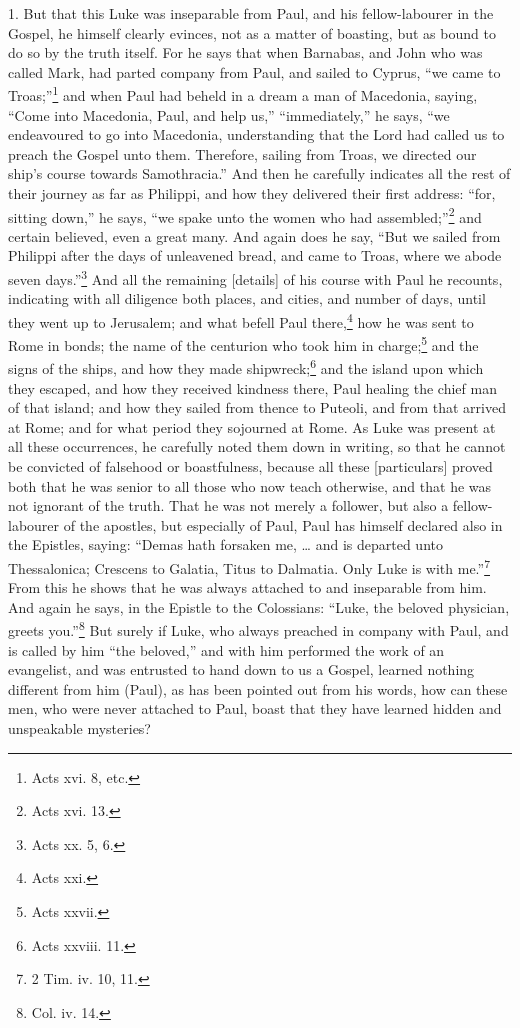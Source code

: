 1. But that this Luke was inseparable from Paul, and his fellow-labourer in the Gospel, he himself clearly evinces, not as a matter of boasting, but as bound to do so by the truth itself. For he says that when Barnabas, and John who was called Mark, had parted company from Paul, and sailed to Cyprus, “we came to Troas;”\footnote{Acts xvi. 8, etc.} and when Paul had beheld in a dream a man of Macedonia, saying, “Come into Macedonia, Paul, and help us,” “immediately,” he says, “we endeavoured to go into Macedonia, understanding that the Lord had called us to preach the Gospel unto them. Therefore, sailing from Troas, we directed our ship’s course towards Samothracia.” And then he carefully indicates all the rest of their journey as far as Philippi, and how they delivered their first address: “for, sitting down,” he says, “we spake unto the women who had assembled;”\footnote{Acts xvi. 13.} and certain believed, even a great many. And again does he say, “But we sailed from Philippi after the days of unleavened bread, and came to Troas, where we abode seven days.”\footnote{Acts xx. 5, 6.} And all the remaining [details] of his course with Paul he recounts, indicating with all diligence both places, and cities, and number of days, until they went up to Jerusalem; and what befell Paul there,\footnote{Acts xxi.} how he was sent to Rome in bonds; the name of the centurion who took him in charge;\footnote{Acts xxvii.} and the signs of the ships, and how they made shipwreck;\footnote{Acts xxviii. 11.} and the island upon which they escaped, and how they received kindness there, Paul healing the chief man of that island; and how they sailed from thence to Puteoli, and from that arrived at Rome; and for what period they sojourned at Rome. As Luke was present at all these occurrences, he carefully noted them down in writing, so that he cannot be convicted of falsehood or boastfulness, because all these [particulars] proved both that he was senior to all those who now teach otherwise, and that he was not ignorant of the truth. That he  was not merely a follower, but also a fellow-labourer of the apostles, but especially of Paul, Paul has himself declared also in the Epistles, saying: “Demas hath forsaken me, … and is departed unto Thessalonica; Crescens to Galatia, Titus to Dalmatia. Only Luke is with me.”\footnote{2 Tim. iv. 10, 11.} From this he shows that he was always attached to and inseparable from him. And again he says, in the Epistle to the Colossians: “Luke, the beloved physician, greets you.”\footnote{Col. iv. 14.} But surely if Luke, who always preached in company with Paul, and is called by him “the beloved,” and with him performed the work of an evangelist, and was entrusted to hand down to us a Gospel, learned nothing different from him (Paul), as has been pointed out from his words, how can these men, who were never attached to Paul, boast that they have learned hidden and unspeakable mysteries?

